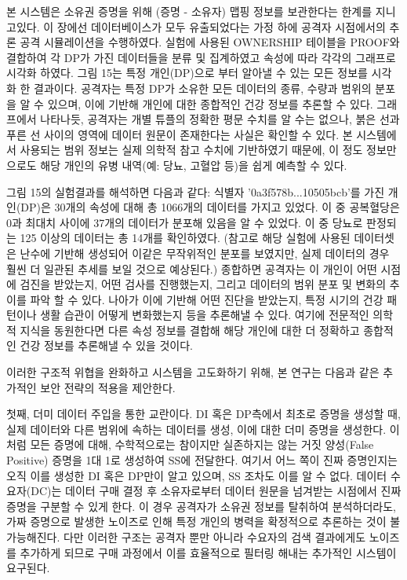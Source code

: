 본 시스템은 소유권 증명을 위해 (증명 - 소유자) 맵핑 정보를 보관한다는 한계를 지니고있다. 이 장에선 데이터베이스가 모두 유출되었다는 가정 하에 공격자 시점에서의 추론 공격 시뮬레이션을 수행하였다. 실험에 사용된 OWNERSHIP 테이블을 PROOF와 결합하여 각 DP가 가진 데이터들을 분류 및 집계하였고 속성에 따라 각각의 그래프로 시각화 하였다. 그림 15는 특정 개인(DP)으로 부터 알아낼 수 있는 모든 정보를 시각화 한 결과이다. 공격자는 특정 DP가 소유한 모든 데이터의 종류, 수량과 범위의 분포을 알 수 있으며, 이에 기반해 개인에 대한 종합적인 건강 정보를 추론할 수 있다. 그래프에서 나타나듯, 공격자는 개별 튜플의 정확한 평문 수치를 알 수는 없으나, 붉은 선과 푸른 선 사이의 영역에 데이터 원문이 존재한다는 사실은 확인할 수 있다. 본 시스템에서 사용되는 범위 정보는 실제 의학적 참고 수치에 기반하였기 때문에, 이 정도 정보만으로도 해당 개인의 유병 내역(예: 당뇨, 고혈압 등)을 쉽게 예측할 수 있다. 

\bigskip

그림 15의 실험결과를 해석하면 다음과 같다: 식별자 '0a3f578b...10505bcb'를 가진 개인(DP)은 30개의 속성에 대해 총 1066개의 데이터를 가지고 있었다. 이 중 공복혈당은 0과 최대치 사이에 37개의 데이터가 분포해 있음을 알 수 있었다. 이 중 당뇨로 판정되는 125 이상의 데이터는 총 14개를 확인하였다. (참고로 해당 실험에 사용된 데이터셋은 난수에 기반해 생성되어 이같은 무작위적인 분포를 보였지만, 실제 데이터의 경우 훨씬 더 일관된 추세를 보일 것으로 예상된다.) 종합하면 공격자는 이 개인이 어떤 시점에 검진을 받았는지, 어떤 검사를 진행했는지, 그리고 데이터의 범위 분포 및 변화의 추이를 파악 할 수 있다. 나아가 이에 기반해 어떤 진단을 받았는지, 특정 시기의 건강 패턴이나 생활 습관이 어떻게 변화했는지 등을 추론해낼 수 있다. 여기에 전문적인 의학적 지식을 동원한다면 다른 속성 정보를 결합해 해당 개인에 대한 더 정확하고 종합적인 건강 정보를 추론해낼 수 있을 것이다.

\bigskip

이러한 구조적 위협을 완화하고 시스템을 고도화하기 위해, 본 연구는 다음과 같은 추가적인 보안 전략의 적용을 제안한다.

\bigskip

첫째, 더미 데이터 주입을 통한 교란이다. DI 혹은 DP측에서 최초로 증명을 생성할 때, 실제 데이터와 다른 범위에 속하는 데이터를 생성, 이에 대한 더미 증명을 생성한다. 이처럼 모든 증명에 대해, 수학적으로는 참이지만 실존하지는 않는 거짓 양성(False Positive) 증명을 1대 1로 생성하여 SS에 전달한다. 여기서 어느 쪽이 진짜 증명인지는 오직 이를 생성한 DI 혹은 DP만이 알고 있으며, SS 조차도 이를 알 수 없다. 데이터 수요자(DC)는 데이터 구매 결정 후 소유자로부터 데이터 원문을 넘겨받는 시점에서 진짜 증명을 구분할 수 있게 한다. 이 경우 공격자가 소유권 정보를 탈취하여 분석하더라도, 가짜 증명으로 발생한 노이즈로 인해 특정 개인의 병력을 확정적으로 추론하는 것이 불가능해진다. 다만 이러한 구조는 공격자 뿐만 아니라 수요자의 검색 결과에게도 노이즈를 추가하게 되므로 구매 과정에서 이를 효율적으로 필터링 해내는 추가적인 시스템이 요구된다.

